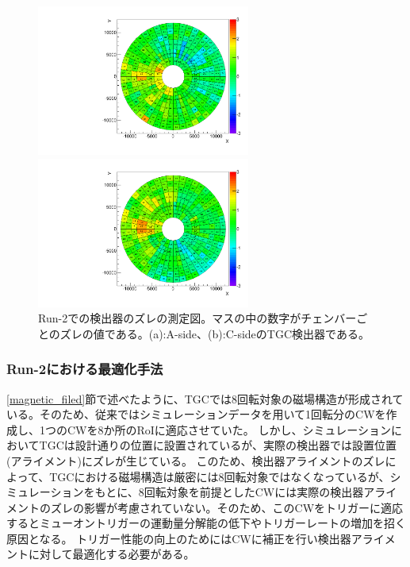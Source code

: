 \begin{figure}
    \begin{minipage}[tb]{0.4\linewidth}
        \centering
        \includegraphics[clip, width=7cm]{fig/3/TGCAlign_CW.muon.bias.20160606.v1.A-side.pdf}
        \vspace{10pt}
        \subcaption{}
    \end{minipage}
    \hfill
    \begin{minipage}[tb]{0.4\linewidth}
        \centering
        \includegraphics[clip, width=7cm]{fig/3/TGCAlign_CW.muon.bias.20160606.v1.C-side.pdf}
        \vspace{10pt}
        \subcaption{}
    \end{minipage}
    \caption{Run-2での検出器のズレの測定図。マスの中の数字がチェンバーごとのズレの値である。(a):A-side、(b):C-sideのTGC検出器である。}
    \label{fig:ズレ}
\end{figure}


\subsubsection{Run-2における最適化手法}
\ref{magnetic_filed}節で述べたように、TGCでは8回転対象の磁場構造が形成されている。そのため、従来ではシミュレーションデータを用いて1回転分のCWを作成し、1つのCWを8か所のRoIに適応させていた。
しかし、シミュレーションにおいてTGCは設計通りの位置に設置されているが、実際の検出器では設置位置(アライメント)にズレが生じている。
このため、検出器アライメントのズレによって、TGCにおける磁場構造は厳密には8回転対象ではなくなっているが、シミュレーションをもとに、8回転対象を前提としたCWには実際の検出器アライメントのズレの影響が考慮されていない。そのため、このCWをトリガーに適応するとミューオントリガーの運動量分解能の低下やトリガーレートの増加を招く原因となる。
トリガー性能の向上のためにはCWに補正を行い検出器アライメントに対して最適化する必要がある。


